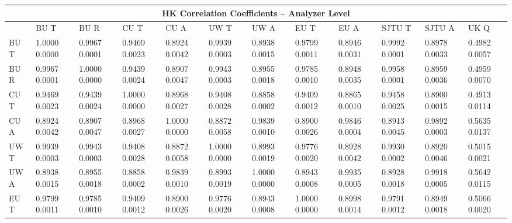 
\begin{landscape}
\begin{table}
\small
\centering
\renewcommand{\arraystretch}{1.5}
\begin{tabularx}{1\linewidth}{@{\extracolsep{\fill}}lXXXXXXXXXXX}
  \toprule
  	\multicolumn{12}{c}{{\normalsize HK Correlation Coefficients -- Analyzer Level}} \\
  \midrule
  	       & BU T & BU R & CU T & CU A & UW T & UW A & EU T & EU A & SJTU T & SJTU A & UK Q \\
  \midrule
	BU T   & 1.0000 0.0000 & 0.9967 0.0001 & 0.9469 0.0023 & 0.8924 0.0042 & 0.9939 0.0003 & 0.8938 0.0015 & 0.9799 0.0011 & 0.8946 0.0031 & 0.9992 0.0001 & 0.8978 0.0033 & 0.4982 0.0057  \\
	BU R   & 0.9967 0.0001 & 1.0000 0.0000 & 0.9439 0.0024 & 0.8907 0.0047 & 0.9943 0.0003 & 0.8955 0.0018 & 0.9785 0.0010 & 0.8948 0.0035 & 0.9958 0.0001 & 0.8959 0.0036 & 0.4959 0.0070  \\
	CU T   & 0.9469 0.0023 & 0.9439 0.0024 & 1.0000 0.0000 & 0.8968 0.0027 & 0.9408 0.0028 & 0.8858 0.0002 & 0.9409 0.0012 & 0.8865 0.0010 & 0.9458 0.0025 & 0.8900 0.0015 & 0.4913 0.0114  \\
	CU A   & 0.8924 0.0042 & 0.8907 0.0047 & 0.8968 0.0027 & 1.0000 0.0000 & 0.8872 0.0058 & 0.9839 0.0010 & 0.8900 0.0026 & 0.9846 0.0004 & 0.8913 0.0045 & 0.9892 0.0003 & 0.5635 0.0137  \\
	UW T   & 0.9939 0.0003 & 0.9943 0.0003 & 0.9408 0.0028 & 0.8872 0.0058 & 1.0000 0.0000 & 0.8993 0.0019 & 0.9776 0.0020 & 0.8928 0.0042 & 0.9930 0.0002 & 0.8920 0.0046 & 0.5015 0.0021  \\
	UW A   & 0.8938 0.0015 & 0.8955 0.0018 & 0.8858 0.0002 & 0.9839 0.0010 & 0.8993 0.0019 & 1.0000 0.0000 & 0.8943 0.0008 & 0.9935 0.0005 & 0.8928 0.0018 & 0.9918 0.0005 & 0.5642 0.0115  \\
	EU T   & 0.9799 0.0011 & 0.9785 0.0010 & 0.9409 0.0012 & 0.8900 0.0026 & 0.9776 0.0020 & 0.8943 0.0008 & 1.0000 0.0000 & 0.8998 0.0014 & 0.9791 0.0012 & 0.8949 0.0018 & 0.5066 0.0020  \\

\end{tabularx}
\end{table}
\end{landscape}
